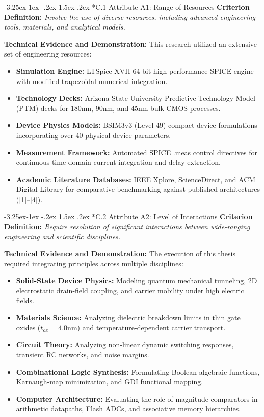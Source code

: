 \documentclass[12pt,a4paper,oneside]{report}
\makeatletter
\renewcommand\subsection{\@startsection{subsection}{2}{\z@}%
                                     {-3.25ex\@plus -1ex \@minus -.2ex}%
                                     {1.5ex \@plus .2ex}%
                                     {\normalfont\normalsize\bfseries\itshape}}
\makeatother
\begin{document}
\subsection*{C.1 Attribute A1: Range of Resources}
\textbf{Criterion Definition:} \textit{Involve the use of diverse resources, including advanced engineering tools, materials, and analytical models.}

\noindent\textbf{Technical Evidence and Demonstration:}
This research utilized an extensive set of engineering resources:
\begin{itemize}
\item \textbf{Simulation Engine:} LTSpice XVII 64-bit high-performance SPICE engine with modified trapezoidal numerical integration.
\item \textbf{Technology Decks:} Arizona State University Predictive Technology Model (PTM) decks for 180nm, 90nm, and 45nm bulk CMOS processes.
\item \textbf{Device Physics Models:} BSIM3v3 (Level 49) compact device formulations incorporating over 40 physical device parameters.
\item \textbf{Measurement Framework:} Automated SPICE .meas control directives for continuous time-domain current integration and delay extraction.
\item \textbf{Academic Literature Databases:} IEEE Xplore, ScienceDirect, and ACM Digital Library for comparative benchmarking against published architectures ([1]--[4]).
\end{itemize}

\subsection*{C.2 Attribute A2: Level of Interactions}
\textbf{Criterion Definition:} \textit{Require resolution of significant interactions between wide-ranging engineering and scientific disciplines.}

\noindent\textbf{Technical Evidence and Demonstration:}
The execution of this thesis required integrating principles across multiple disciplines:
\begin{itemize}
\item \textbf{Solid-State Device Physics:} Modeling quantum mechanical tunneling, 2D electrostatic drain-field coupling, and carrier mobility under high electric fields.
\item \textbf{Materials Science:} Analyzing dielectric breakdown limits in thin gate oxides ($t_{ox} = 4.0\text{nm}$) and temperature-dependent carrier transport.
\item \textbf{Circuit Theory:} Analyzing non-linear dynamic switching responses, transient RC networks, and noise margins.
\item \textbf{Combinational Logic Synthesis:} Formulating Boolean algebraic functions, Karnaugh-map minimization, and GDI functional mapping.
\item \textbf{Computer Architecture:} Evaluating the role of magnitude comparators in arithmetic datapaths, Flash ADCs, and associative memory hierarchies.
\end{itemize}
\end{document}
